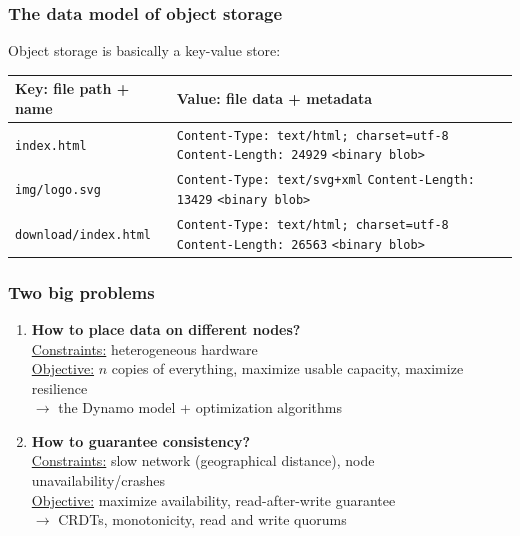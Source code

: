 \documentclass[aspectratio=169]{beamer}
\begin{document}
\begin{frame}
	\frametitle{The data model of object storage}
	Object storage is basically a key-value store:
	\vspace{1em}

		\begin{center}
		\begin{tabular}{|l|p{8cm}|}
			\hline
			\textbf{Key: file path + name} & \textbf{Value: file data + metadata} \\
			\hline
			\hline
			\texttt{index.html} &
				\texttt{Content-Type: text/html; charset=utf-8} \newline
				\texttt{Content-Length: 24929} \newline
				\texttt{<binary blob>} \\ 
			\hline
			\texttt{img/logo.svg} &
				\texttt{Content-Type: text/svg+xml} \newline
				\texttt{Content-Length: 13429} \newline
				\texttt{<binary blob>} \\ 
			\hline
			\texttt{download/index.html} &
				\texttt{Content-Type: text/html; charset=utf-8} \newline
				\texttt{Content-Length: 26563} \newline
				\texttt{<binary blob>} \\ 
			\hline
		\end{tabular}
		\end{center}

\end{frame}


\begin{frame}
	\frametitle{Two big problems}
	\begin{enumerate}
		\item \textbf{How to place data on different nodes?}\\
			\vspace{1em}
			\underline{Constraints:} heterogeneous hardware\\
			\underline{Objective:} $n$ copies of everything, maximize usable capacity, maximize resilience\\
			\vspace{1em}
			$\to$ the Dynamo model + optimization algorithms
			\vspace{2em}
		\item<2-> \textbf{How to guarantee consistency?}\\
			\vspace{1em}
			\underline{Constraints:} slow network (geographical distance), node unavailability/crashes\\
			\underline{Objective:} maximize availability, read-after-write guarantee\\
			\vspace{1em}
			$\to$ CRDTs, monotonicity, read and write quorums
	\end{enumerate}
\end{frame}
\end{document}
